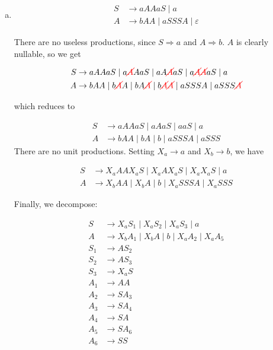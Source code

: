 \begin{solution}\mbox{\\}
    \begin{enumerate}[(a)]
        \item 
        \begin{align*}
            S &\to aAAaS\mid a\\
            A &\to bAA\mid aSSSA\mid \varepsilon 
        \end{align*}

        There are no useless productions, since \(S\Rightarrow a\) and \(A\Rightarrow b\). \(A\) is clearly nullable, so we get  

        \begin{align*}
            S &\to aAAaS\mid a{\color{red}\cancel{A}}AaS\mid aA{\color{red}\cancel{A}}aS\mid a{\color{red}\cancel{A}}{\color{red}\cancel{A}}aS\mid a\\
            A &\to bAA\mid b{\color{red}\cancel{A}}A\mid bA{\color{red}\cancel{A}}\mid b{\color{red}\cancel{A}}{\color{red}\cancel{A}} \mid aSSSA\mid aSSS{\color{red}\cancel{A}} 
        \end{align*}

        which reduces to 

        \begin{align*}
            S &\to aAAaS\mid aAaS\mid aaS\mid a\\
            A &\to bAA\mid bA\mid b \mid aSSSA\mid aSSS 
        \end{align*}
        There are no unit productions. Setting \(X_a\to a\) and \(X_b\to b\), we have 

        \begin{align*}
            S &\to X_a AAX_a S\mid X_a AX_a S\mid X_a X_a S\mid a\\
            A &\to X_b AA\mid X_b A\mid b \mid X_a SSSA\mid X_a SSS 
        \end{align*}

        Finally, we decompose:

        \begin{align*}
            S &\to X_a S_1\mid X_a S_2\mid X_a S_3\mid a\\
            A &\to X_b A_1\mid X_b A\mid b \mid X_a A_2\mid X_a A_5 \\
            S_1 &\to AS_2\\
            S_2 &\to AS_3\\
            S_3 &\to X_a S\\
            A_1 &\to AA\\
            A_2 &\to SA_3\\
            A_3 &\to SA_4\\
            A_4 &\to SA\\
            A_5 &\to SA_6\\
            A_6 &\to SS
        \end{align*}


\end{enumerate}
\end{solution}
